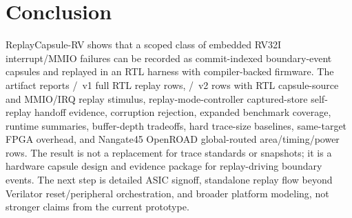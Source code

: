 \section{Conclusion}

ReplayCapsule-RV shows that a scoped class of embedded RV32I interrupt/MMIO failures can be recorded as commit-indexed boundary-event capsules and replayed in an RTL harness with compiler-backed firmware. The artifact reports \rcFullReplayPass/\rcFullReplayTotal\ v1 full RTL replay rows, \rcVTwoReplayPass/\rcVTwoReplayTotal\ v2 rows with RTL capsule-source and MMIO/IRQ replay stimulus, replay-mode-controller captured-store self-replay handoff evidence, corruption rejection, expanded benchmark coverage, runtime summaries, buffer-depth tradeoffs, hard trace-size baselines, same-target FPGA overhead, and Nangate45 OpenROAD global-routed area/timing/power rows. The result is not a replacement for trace standards or snapshots; it is a hardware capsule design and evidence package for replay-driving boundary events. The next step is detailed ASIC signoff, standalone replay flow beyond Verilator reset/peripheral orchestration, and broader platform modeling, not stronger claims from the current prototype.
